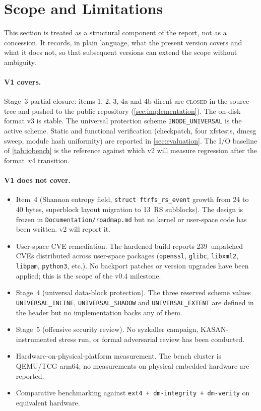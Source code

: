 \section{Scope and Limitations}\label{sec:limits}

This section is treated as a structural component of the report,
not as a concession. It records, in plain language, what the
present version covers and what it does not, so that subsequent
versions can extend the scope without ambiguity.

\paragraph{V1 covers.}
Stage~3 partial closure: items 1, 2, 3, 4a and 4b-dirent are
\textsc{closed} in the source tree and pushed to the public
repository (\cref{sec:implementation}). The on-disk format
v3 is stable. The universal protection scheme
\texttt{INODE\_UNIVERSAL} is the active scheme. Static and
functional verification (checkpatch, four xfstests, dmesg sweep,
module hash uniformity) are reported in \cref{sec:evaluation}.
The I/O baseline of \cref{tab:iobench} is the reference
against which v2 will measure regression after the format~v4
transition.

\paragraph{V1 does not cover.}
\begin{itemize}
\item Item~4 (Shannon entropy field, \texttt{struct ftrfs\_rs\_event}
  growth from 24 to 40 bytes, superblock layout migration to 13~RS
  subblocks). The design is frozen in
  \texttt{Documentation/roadmap.md} but no kernel or user-space
  code has been written. v2 will report it.
\item User-space CVE remediation. The hardened build reports
  239~unpatched CVEs distributed across user-space packages
  (\texttt{openssl}, \texttt{glibc}, \texttt{libxml2},
  \texttt{libpam}, \texttt{python3}, etc.). No backport patches
  or version upgrades have been applied; this is the scope of
  the v0.4 milestone.
\item Stage~4 (universal data-block protection). The three
  reserved scheme values \texttt{UNIVERSAL\_INLINE},
  \texttt{UNIVERSAL\_SHADOW} and \texttt{UNIVERSAL\_EXTENT} are
  defined in the header but no implementation backs any of them.
\item Stage~5 (offensive security review). No syzkaller campaign,
  KASAN-instrumented stress run, or formal adversarial review has
  been conducted.
\item Hardware-on-physical-platform measurement. The bench cluster
  is QEMU/TCG arm64; no measurements on physical embedded hardware
  are reported.
\item Comparative benchmarking against
  \texttt{ext4 + dm-integrity + dm-verity} on equivalent hardware.
\end{itemize}

